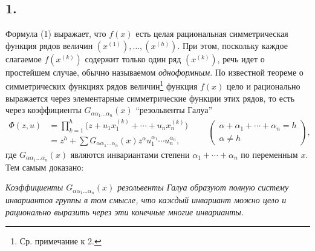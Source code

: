 \documentclass[11pt]{article}
\begin{document}
\subsection*{1.}
Формула (1) выражает, что $f(x)$ есть целая рациональная симметрическая функция рядов величин $(x^{(1)}),\ldots,(x^{(h)})$. При этом, поскольку каждое слагаемое $f(x^{(k)})$ содержит только один ряд $(x^{(k)})$, речь идет о простейшем случае, обычно называемом \emph{одноформным}. По известной теореме о симметрических функциях рядов величин\footnote{Ср. примечание к 2.} функция $f(x)$ цело и рационально выражается через элементарные симметрические функции этих рядов, то есть через коэффициенты $G_{\alpha\alpha_1\ldots\alpha_n}(x)$ ``резольвенты Галуа''
\[
\begin{aligned}
  \Phi(z,u)
  &=\prod_{k=1}^{h}\bigl(z+u_1x_1^{(k)}+\cdots+u_nx_n^{(k)}\bigr) \\
  &=z^h+
    \sum G_{\alpha\alpha_1\ldots\alpha_n}(x)
    z^{\alpha}u_1^{\alpha_1}\cdots u_n^{\alpha_n},
\end{aligned}
\qquad
\left(\begin{array}{c}
\alpha+\alpha_1+\cdots+\alpha_n=h\\
\alpha\ne h
\end{array}\right),
\]
где $G_{\alpha\alpha_1\ldots\alpha_n}(x)$ являются инвариантами степени $\alpha_1+\cdots+\alpha_n$ по переменным $x$. Тем самым доказано:

\emph{Коэффициенты $G_{\alpha\alpha_1\ldots\alpha_n}(x)$ резольвенты Галуа образуют полную систему инвариантов группы в том смысле, что каждый инвариант можно цело и рационально выразить через эти конечные многие инварианты.}
\end{document}
